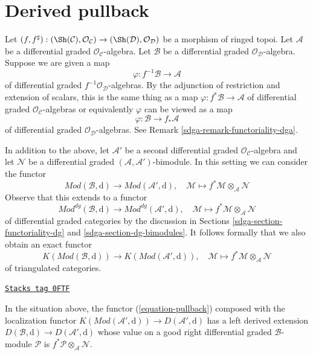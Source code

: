 \section{Derived pullback}
\label{sdga-section-derived-pullback}
Let $(f, f^\sharp) : (\Sh(\mathcal{C}), \mathcal{O}_\mathcal{C})
\to (\Sh(\mathcal{D}), \mathcal{O}_\mathcal{D})$
be a morphism of ringed topoi. Let $\mathcal{A}$ be a differential
graded $\mathcal{O}_\mathcal{C}$-algebra. Let $\mathcal{B}$ be a
differential graded $\mathcal{O}_\mathcal{D}$-algebra.
Suppose we are given a map
$$
\varphi : f^{-1}\mathcal{B} \to \mathcal{A}
$$
of differential graded $f^{-1}\mathcal{O}_\mathcal{D}$-algebras.
By the adjunction of restriction and extension of scalars, this
is the same thing as a map $\varphi : f^*\mathcal{B} \to \mathcal{A}$
of differential graded $\mathcal{O}_\mathcal{C}$-algebras or equivalently
$\varphi$ can be viewed as a map
$$
\varphi : \mathcal{B} \to f_*\mathcal{A}
$$
of differential graded $\mathcal{O}_\mathcal{D}$-algebras.
See Remark \ref{sdga-remark-functoriality-dga}.

\medskip\noindent
In addition to the above, let $\mathcal{A}'$ be a second differential
graded $\mathcal{O}_\mathcal{C}$-algebra and let $\mathcal{N}$
be a differential graded $(\mathcal{A}, \mathcal{A}')$-bimodule.
In this setting we can consider the functor
$$
\textit{Mod}(\mathcal{B}, \text{d})
\longrightarrow
\textit{Mod}(\mathcal{A}', \text{d}),\quad
\mathcal{M} \longmapsto f^*\mathcal{M} \otimes_{\mathcal{A}} \mathcal{N}
$$
Observe that this extends to a functor
$$
\textit{Mod}^{dg}(\mathcal{B}, \text{d})
\longrightarrow
\textit{Mod}^{dg}(\mathcal{A}', \text{d}),\quad
\mathcal{M} \longmapsto f^*\mathcal{M} \otimes_{\mathcal{A}} \mathcal{N}
$$
of differential graded categories by the discussion in
Sections \ref{sdga-section-functoriality-dg} and \ref{sdga-section-dg-bimodules}.
It follows formally that we also obtain an exact functor
\begin{equation}
\label{equation-pullback}
K(\textit{Mod}(\mathcal{B}, \text{d}))
\longrightarrow
K(\textit{Mod}(\mathcal{A}', \text{d})),\quad
\mathcal{M} \longmapsto f^*\mathcal{M} \otimes_{\mathcal{A}} \mathcal{N}
\end{equation}
of triangulated categories.

\begin{lemma}
\label{sdga-lemma-derived-tensor-product}
\href{https://stacks.math.columbia.edu/tag/0FTF}{\texttt{Stacks tag 0FTF}}

In the situation above, the functor (\ref{equation-pullback})
composed with the localization functor
$K(\textit{Mod}(\mathcal{A}', \text{d})) \to D(\mathcal{A}', \text{d})$
has a left derived extension
$D(\mathcal{B}, \text{d}) \to D(\mathcal{A}', \text{d})$ whose
value on a good right differential graded $\mathcal{B}$-module
$\mathcal{P}$ is $f^*\mathcal{P} \otimes_\mathcal{A} \mathcal{N}$.
\end{lemma}

